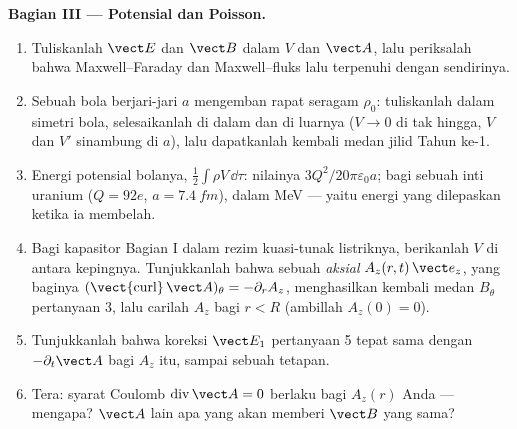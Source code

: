 \begin{problem}
\medskip
\noindent\textbf{Bagian III --- Potensial dan Poisson.}
\begin{enumerate}[resume]
  \item Tuliskanlah $\vect E$ dan $\vect B$ dalam $V$ dan $\vect A$, lalu periksalah
        bahwa Maxwell--Faraday dan Maxwell--fluks lalu terpenuhi
        dengan sendirinya.
  \item Sebuah bola berjari-jari $a$ mengemban rapat seragam $\rho_0$: tuliskanlah
         dalam simetri bola, selesaikanlah di dalam dan di
        luarnya ($V \to 0$ di tak hingga, $V$ dan $V'$ sinambung di $a$), lalu
        dapatkanlah kembali medan jilid Tahun ke-1.
  \item Energi potensial bolanya, $\tfrac12\int\rho V\,\dd\tau$: nilainya
        $3Q^2/20\pi\varepsilon_0a$; bagi sebuah inti uranium ($Q = 92e$, $a =
        \qty{7.4}{fm}$), dalam MeV --- yaitu energi yang dilepaskan ketika ia membelah.
  \item Bagi kapasitor Bagian I dalam rezim kuasi-tunak listriknya,
        berikanlah $V$ di antara kepingnya. Tunjukkanlah bahwa sebuah
         \emph{aksial} $A_z(r, t)\,\vect e_z$, yang baginya $(\operatorname{\vect{curl}}
        \vect A)_\theta = -\partial_rA_z$, menghasilkan kembali medan $B_\theta$
        pertanyaan 3, lalu carilah $A_z$ bagi $r < R$ (ambillah $A_z(0) = 0$).
  \item Tunjukkanlah bahwa koreksi $\vect E_1$ pertanyaan 5 tepat sama dengan
        $-\partial_t\vect A$ bagi $A_z$ itu, sampai sebuah tetapan.
  \item Tera: syarat Coulomb $\operatorname{div}\vect A = 0$ berlaku bagi
        $A_z(r)$ Anda --- mengapa? $\vect A$ lain apa yang akan memberi $\vect B$ yang sama?
\end{enumerate}


\end{problem}
